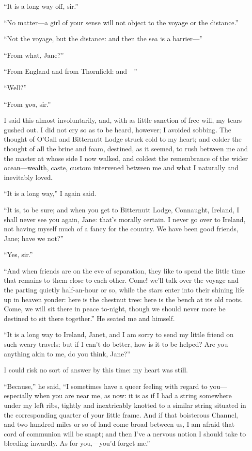 \enquote{It is a long way off, sir.}

\enquote{No matter---a girl of your sense will not object to the voyage
or the distance.}

\enquote{Not the voyage, but the distance: and then the sea is a
barrier---}

\enquote{From what, Jane?}

\enquote{From England and from Thornfield: and---}

\enquote{Well?}

\enquote{From \emph{you}, sir.}

I said this almost involuntarily, and, with as little sanction of free
will, my tears gushed out. I did not cry so as to be heard, however; I
avoided sobbing. The thought of \Mrs{} O'Gall and Bitternutt Lodge struck
cold to my heart; and colder the thought of all the brine and foam,
destined, as it seemed, to rush between me and the master at whose side
I now walked, and coldest the remembrance of the wider ocean---wealth,
caste, custom intervened between me and what I naturally and inevitably
loved.

\enquote{It is a long way,} I again said.

\enquote{It is, to be sure; and when you get to Bitternutt Lodge,
Connaught, Ireland, I shall never see you again, Jane: that's morally
certain. I never go over to Ireland, not having myself much of a fancy
for the country. We have been good friends, Jane; have we not?}

\enquote{Yes, sir.}

\enquote{And when friends are on the eve of separation, they like to
spend the little time that remains to them close to each other. Come!
we'll talk over the voyage and the parting quietly half-an-hour or so,
while the stars enter into their shining life up in heaven yonder: here
is the chestnut tree: here is the bench at its old roots. Come, we will
sit there in peace to-night, though we should never more be destined to
sit there together.} He seated me and himself.

\enquote{It is a long way to Ireland, Janet, and I am sorry to send my
little friend on such weary travels: but if I can't do better, how is it
to be helped? Are you anything akin to me, do you think, Jane?}

I could risk no sort of answer by this time: my heart was still.

\enquote{Because,} he said, \enquote{I sometimes have a queer feeling
with regard to you---especially when you are near me, as now: it is as
if I had a string somewhere under my left ribs, tightly and inextricably
knotted to a similar string situated in the corresponding quarter of
your little frame. And if that boisterous Channel, and two hundred
miles or so of land come broad between us, I am afraid that cord of
communion will be snapt; and then I've a nervous notion I should take to
bleeding inwardly. As for you,---you'd forget me.}

